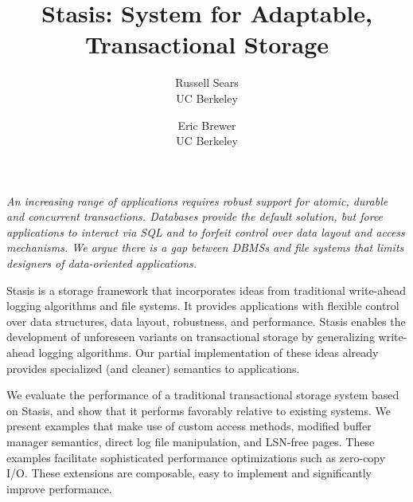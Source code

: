 \documentclass[letterpaper,twocolumn,10pt]{article}
\newcommand{\yad}{Stasis\xspace}
\begin{document}
\date{}


\title{\Large \bf \yad: System for Adaptable, Transactional Storage}

\author{
{\rm Russell Sears}\\
UC Berkeley
\and
{\rm Eric Brewer}\\
UC Berkeley
} %

\maketitle




{\em An increasing range of applications requires robust support for atomic, durable and concurrent
transactions.  Databases provide the default solution, but force
applications to interact via SQL and to forfeit control over data
layout and access mechanisms.  We argue there is a gap between DBMSs and file systems that limits designers of data-oriented applications.

\yad is a storage framework that incorporates ideas from traditional
write-ahead logging algorithms and file systems.
It provides applications with flexible control over data structures, data layout, robustness, and performance.
\yad enables the development of
unforeseen variants on transactional storage by generalizing
write-ahead logging algorithms.  Our partial implementation of these
ideas already provides specialized (and cleaner) semantics to applications.

We evaluate the performance of a traditional transactional storage
system based on \yad, and show that it performs favorably relative to existing
systems.  We present examples that make use of custom access methods, modified
buffer manager semantics, direct log file manipulation, and LSN-free
pages.  These examples facilitate sophisticated performance 
optimizations such as zero-copy I/O.  These extensions are composable,
easy to implement and significantly improve performance.

}
\end{document}
